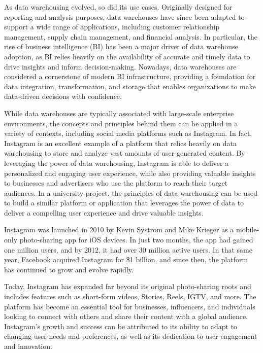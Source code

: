 \documentclass[conference]{IEEEtran}
\begin{document}
As data warehousing evolved, so did its use cases. Originally designed for reporting and analysis purposes, data warehouses have since been adapted to support a wide range of applications, including customer relationship management, supply chain management, and financial analysis. In particular, the rise of business intelligence (BI) has been a major driver of data warehouse adoption, as BI relies heavily on the availability of accurate and timely data to drive insights and inform decision-making. Nowadays, data warehouses are considered a cornerstone of modern BI infrastructure, providing a foundation for data integration, transformation, and storage that enables organizations to make data-driven decisions with confidence. \cite{kimball2013data}\cite{gartner2019magic}

While data warehouses are typically associated with large-scale enterprise environments, the concepts and principles behind them can be applied in a variety of contexts, including social media platforms such as Instagram. In fact, Instagram is an excellent example of a platform that relies heavily on data warehousing to store and analyze vast amounts of user-generated content. By leveraging the power of data warehousing, Instagram is able to deliver a personalized and engaging user experience, while also providing valuable insights to businesses and advertisers who use the platform to reach their target audiences. In a university project, the principles of data warehousing can be used to build a similar platform or application that leverages the power of data to deliver a compelling user experience and drive valuable insights.

Instagram was launched in 2010 by Kevin Systrom and Mike Krieger as a mobile-only photo-sharing app for iOS devices. In just two months, the app had gained one million users, and by 2012, it had over 30 million active users. In that same year, Facebook acquired Instagram for \$1 billion, and since then, the platform has continued to grow and evolve rapidly.

Today, Instagram has expanded far beyond its original photo-sharing roots and includes features such as short-form videos, Stories, Reels, IGTV, and more. The platform has become an essential tool for businesses, influencers, and individuals looking to connect with others and share their content with a global audience. Instagram's growth and success can be attributed to its ability to adapt to changing user needs and preferences, as well as its dedication to user engagement and innovation. \cite{bruns2015use}
\end{document}
